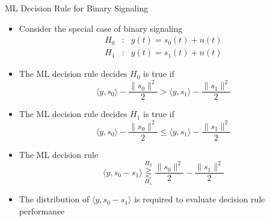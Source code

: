 \documentclass[t]{beamer}
\begin{document}
\begin{frame}{ML Decision Rule for Binary Signaling}
  \footnotesize
  \begin{itemize}
    \item \pause Consider the special case of binary signaling
      \begin{equation*}
        \begin{array}{ccc}
            H_0 & : & y(t) = s_0(t) + n(t) \\
            H_1 & : & y(t) = s_1(t) + n(t) 
        \end{array}
      \end{equation*}
    \item \pause The ML decision rule decides $H_0$ is true if \pause
      \begin{equation*}
        \langle y, s_0 \rangle - \frac{\lVert s_0 \rVert^2}{2} > \langle y, s_1 \rangle - \frac{\lVert s_1 \rVert^2}{2}
      \end{equation*}
    \item \pause The ML decision rule decides $H_1$ is true if \pause
      \begin{equation*}
        \langle y, s_0 \rangle - \frac{\lVert s_0 \rVert^2}{2} \leq \langle y, s_1 \rangle - \frac{\lVert s_1 \rVert^2}{2}
      \end{equation*}
    \item \pause The ML decision rule
      \begin{equation*}
        \langle y, s_0 - s_1 \rangle \overset{H_0}{\underset{H_1}{\gtreqless}} \frac{\lVert s_0 \rVert^2}{2} - \frac{\lVert s_1 \rVert^2}{2}
      \end{equation*}
    \item \pause The distribution of $\langle y, s_0 - s_1 \rangle$ is required to evaluate decision rule performance
  \end{itemize}
  \normalsize
\end{frame}
\end{document}
